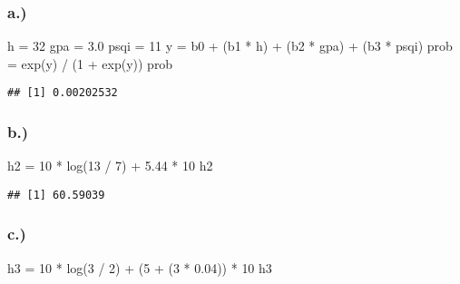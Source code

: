 \documentclass[
]{article}
\newenvironment{Shaded}{\begin{snugshade}}{\end{snugshade}}
\newcommand{\DecValTok}[1]{\textcolor[rgb]{0.00,0.00,0.81}{#1}}
\newcommand{\FloatTok}[1]{\textcolor[rgb]{0.00,0.00,0.81}{#1}}
\newcommand{\FunctionTok}[1]{\textcolor[rgb]{0.00,0.00,0.00}{#1}}
\newcommand{\NormalTok}[1]{#1}
\newcommand{\OtherTok}[1]{\textcolor[rgb]{0.56,0.35,0.01}{#1}}
\newcommand{\SpecialCharTok}[1]{\textcolor[rgb]{0.00,0.00,0.00}{#1}}
\begin{document}
\hypertarget{a.-2}{%
\subsubsection{a.)}\label{a.-2}}

\begin{Shaded}
\begin{Highlighting}[]
\NormalTok{h }\OtherTok{=} \DecValTok{32}
\NormalTok{gpa }\OtherTok{=} \FloatTok{3.0}
\NormalTok{psqi }\OtherTok{=} \DecValTok{11}
\NormalTok{y }\OtherTok{=}\NormalTok{ b0 }\SpecialCharTok{+}\NormalTok{ (b1 }\SpecialCharTok{*}\NormalTok{ h) }\SpecialCharTok{+}\NormalTok{ (b2 }\SpecialCharTok{*}\NormalTok{ gpa) }\SpecialCharTok{+}\NormalTok{ (b3 }\SpecialCharTok{*}\NormalTok{ psqi)}
\NormalTok{prob }\OtherTok{=} \FunctionTok{exp}\NormalTok{(y) }\SpecialCharTok{/}\NormalTok{ (}\DecValTok{1} \SpecialCharTok{+} \FunctionTok{exp}\NormalTok{(y))}
\NormalTok{prob}
\end{Highlighting}
\end{Shaded}

\begin{verbatim}
## [1] 0.00202532
\end{verbatim}

\hypertarget{b.-2}{%
\subsubsection{b.)}\label{b.-2}}

\begin{Shaded}
\begin{Highlighting}[]
\NormalTok{h2 }\OtherTok{=} \DecValTok{10} \SpecialCharTok{*} \FunctionTok{log}\NormalTok{(}\DecValTok{13} \SpecialCharTok{/} \DecValTok{7}\NormalTok{) }\SpecialCharTok{+} \FloatTok{5.44} \SpecialCharTok{*} \DecValTok{10}
\NormalTok{h2}
\end{Highlighting}
\end{Shaded}

\begin{verbatim}
## [1] 60.59039
\end{verbatim}

\hypertarget{c.-2}{%
\subsubsection{c.)}\label{c.-2}}

\begin{Shaded}
\begin{Highlighting}[]
\NormalTok{h3 }\OtherTok{=} \DecValTok{10} \SpecialCharTok{*} \FunctionTok{log}\NormalTok{(}\DecValTok{3} \SpecialCharTok{/} \DecValTok{2}\NormalTok{) }\SpecialCharTok{+}\NormalTok{ (}\DecValTok{5} \SpecialCharTok{+}\NormalTok{ (}\DecValTok{3} \SpecialCharTok{*} \FloatTok{0.04}\NormalTok{)) }\SpecialCharTok{*} \DecValTok{10}
\NormalTok{h3}
\end{Highlighting}
\end{Shaded}
\end{document}
